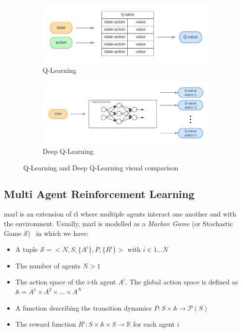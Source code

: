  \begin{figure}[t]
    \begin{subfigure}[b]{0.49\textwidth}
        \centering
        \includegraphics[width=\textwidth]{papers/coordination2023/imgs/q-learning.pdf}
        \caption{Q-Learning}
        \label{coordination2023:fig:ql}
    \end{subfigure}
    \begin{subfigure}[b]{0.49\textwidth}
        \centering
        \includegraphics[width=\textwidth]{papers/coordination2023/imgs/deepQL.pdf}
        \caption{Deep Q-Learning}
        \label{coordination2023:fig:dqn}
    \end{subfigure}
\caption{Q-Learning and Deep Q-Learning visual comparison}\vspace{-10pt}
\end{figure}


\subsection{Multi Agent Reinforcement Learning}
\ac{marl} is an extension of \ac{rl} where multiple agents 
 interact one another and with the environment. 
 Usually, \ac{marl} is modelled as a 
 \emph{Markov Game} (or Stochastic Game $\mathcal{S}$)~\cite{LITTMAN1994157} in which we have:
 \begin{itemize}
    \item A tuple $\mathcal{S} = <N, S, \{A^i\}, P, \{R^i\}>$ with $i \in 1 \dots N$
    \item The number of agents $N > 1$
    \item The action space of the i-th agent $A^i$. The global action space is defined as $\mathbb{A} = A^1 \times A^2 \times \dots \times A^N$
    \item A function describing the transition dynamics $P: S \times \mathbb{A} \rightarrow \mathcal{P}(S)$
    \item The reward function $R^i: S \times \mathbb{A} \times S \rightarrow \mathbb{R}$ for each agent $i$ 
 \end{itemize}

